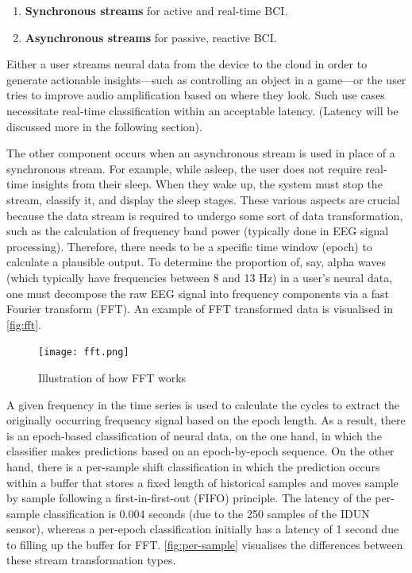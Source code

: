 \begin{enumerate}
  \item \textbf{Synchronous streams} for active and real-time BCI.
  \item \textbf{Asynchronous streams} for passive, reactive BCI.
\end{enumerate}

Either a user streams neural data from the device to the cloud in order to generate actionable insights—such as controlling an object in a game—or the user tries to improve audio amplification based on where they look. Such use cases necessitate real-time classification within an acceptable latency. (Latency will be discussed more in the following section).

The other component occurs when an asynchronous stream is used in place of a synchronous stream. For example, while asleep, the user does not require real-time insights from their sleep. When they wake up, the system must stop the stream, classify it, and display the sleep stages. These various aspects are crucial because the data stream is required to undergo some sort of data transformation, such as the calculation of frequency band power (typically done in EEG signal processing). Therefore, there needs to be a specific time window (epoch) to calculate a plausible output. To determine the proportion of, say, alpha waves (which typically have frequencies between 8 and 13 Hz) in a user’s neural data, one must decompose the raw EEG signal into frequency components via a fast Fourier transform (FFT). An example of FFT transformed data is visualised in  \autoref{fig:fft}.

\begin{figure}[!ht]
  \centering
  \texttt{[image: fft.png]}
  \caption[Illustration of how FFT works.]{Illustration of how FFT works \citep{3blue1brown_but_2018}}
  \label{fig:fft}
\end{figure}

A given frequency in the time series is used to calculate the cycles to extract the originally occurring frequency signal based on the epoch length. As a result, there is an epoch-based classification of neural data, on the one hand, in which the classifier makes predictions based on an epoch-by-epoch sequence. On the other hand, there is a per-sample shift classification in which the prediction occurs within a buffer that stores a fixed length of historical samples and moves sample by sample following a first-in-first-out (FIFO) principle. The latency of the per-sample classification is 0.004 seconds (due to the 250 samples of the IDUN sensor), whereas a per-epoch classification initially has a latency of 1 second due to filling up the buffer for FFT. \autoref{fig:per-sample} visualises the differences between these stream transformation types.

